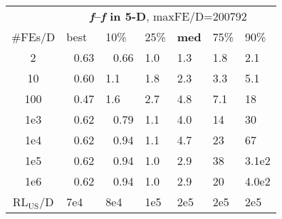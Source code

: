 \begin{tabular}{c|llllll}
 & \multicolumn{6}{|c}{\textbf{\textit{f}\raisebox{-0.35ex}{1}--\textit{f}\raisebox{-0.35ex}{24} in 5-D}, maxFE/D=200792}\\
\#FEs/D & best & 10\% & 25\% & \textbf{med} & 75\% & 90\%\\
2 & ~\,0.63 & ~\,0.66 & \hspace*{1ex}1.0 & \hspace*{1ex}1.3 & \hspace*{1ex}1.8 & \hspace*{1ex}2.1\\
10 & ~\,0.60 & \hspace*{1ex}1.1 & \hspace*{1ex}1.8 & \hspace*{1ex}2.3 & \hspace*{1ex}3.3 & \hspace*{1ex}5.1\\
100 & ~\,0.47 & \hspace*{1ex}1.6 & \hspace*{1ex}2.7 & \hspace*{1ex}4.8 & \hspace*{1ex}7.1 & 18\\
1e3 & ~\,0.62 & ~\,0.79 & \hspace*{1ex}1.1 & \hspace*{1ex}4.0 & 14 & 30\\
1e4 & ~\,0.62 & ~\,0.94 & \hspace*{1ex}1.1 & \hspace*{1ex}4.7 & 23 & 67\\
1e5 & ~\,0.62 & ~\,0.94 & \hspace*{1ex}1.0 & \hspace*{1ex}2.9 & 38 & 3.1e2\\
1e6 & ~\,0.62 & ~\,0.94 & \hspace*{1ex}1.0 & \hspace*{1ex}2.9 & 20 & 4.0e2\\
$\text{RL}_{\text{US}}$/D & 7e4 & 8e4 & 1e5 & 2e5 & 2e5 & 2e5
\end{tabular}
